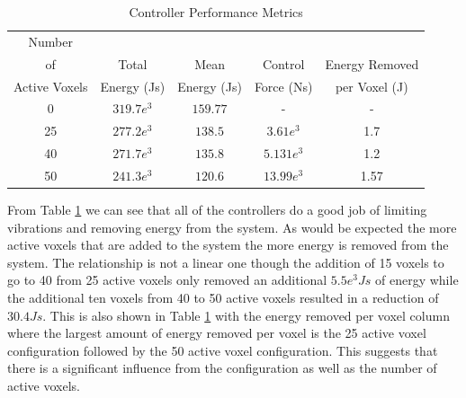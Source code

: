 \documentclass[11pt]{ucthesis}
\begin{document}
\begin{table}[thpb]
\caption{Controller Performance Metrics}
\label{tab:energy}
\begin{center}
\begin{tabular}{|c||c||c||c||c|}
\hline
Number&&&&\\
of&Total&Mean&Control&Energy Removed\\
Active Voxels&Energy (Js)&Energy (Js)&Force (Ns)& per Voxel (J)\\
\hline
0 &$319.7e^{3}$&$159.77$&-&-\\
\hline
25&$277.2e^{3}$&$138.5$&$3.61e^{3}$&1.7\\
\hline
40&$271.7e^{3}$&$135.8$&$5.131e^{3}$&1.2\\
\hline
50&$241.3e^{3}$&$120.6$&$13.99e^{3}$&1.57\\
\hline
\end{tabular}
\end{center}
\end{table}

From Table \ref{tab:energy} we can see that all of the controllers do a good job of limiting vibrations and removing energy from the system. As would be expected the more active voxels that are added to the system the more energy is removed from the system. The relationship is not a linear one though the addition of 15 voxels to go to 40 from 25 active voxels only removed an additional $5.5e^3 Js$ of energy while the additional ten voxels from 40 to 50 active voxels resulted in a reduction of $30.4 Js$. This is also shown in Table \ref{tab:energy} with the energy removed per voxel column where the largest amount of energy removed per voxel is the 25 active voxel configuration followed by the 50 active voxel configuration. This suggests that there is a significant influence from the configuration as well as the number of active voxels.
\end{document}
